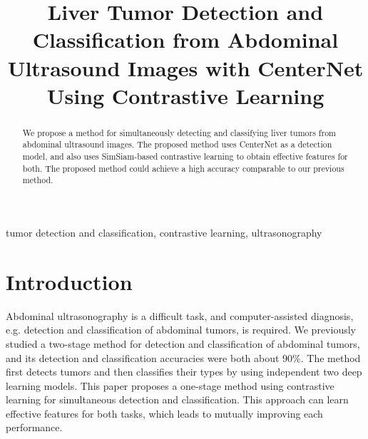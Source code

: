 \documentclass[conference]{IEEEtran}
\begin{document}
    \title{
        Liver Tumor Detection and Classification from Abdominal Ultrasound Images with CenterNet Using Contrastive Learning
    }

    \author{
    }

    \maketitle

    \begin{abstract}
        We propose a method for simultaneously detecting and classifying liver tumors from abdominal ultrasound images.
        The proposed method uses CenterNet as a detection model, and also uses SimSiam-based contrastive learning to obtain effective features for both.
        The proposed method could achieve a high accuracy comparable to our previous method.
    \end{abstract}

    \begin{IEEEkeywords}
        tumor detection and classification, contrastive learning, ultrasonography
    \end{IEEEkeywords}

    \section{Introduction}
        Abdominal ultrasonography is a difficult task, and computer-assisted diagnosis, e.g. detection and classification of abdominal tumors, is required.
        We previously studied a two-stage method for detection\cite{prestudy_det} and classification\cite{prestudy_cls} of abdominal tumors, and its detection and classification accuracies were both about 90\%.
        The method first detects tumors and then classifies their types by using independent two deep learning models.
        This paper proposes a one-stage method using contrastive learning for simultaneous detection and classification.
        This approach can learn effective features for both tasks, which leads to mutually improving each performance.
\end{document}
